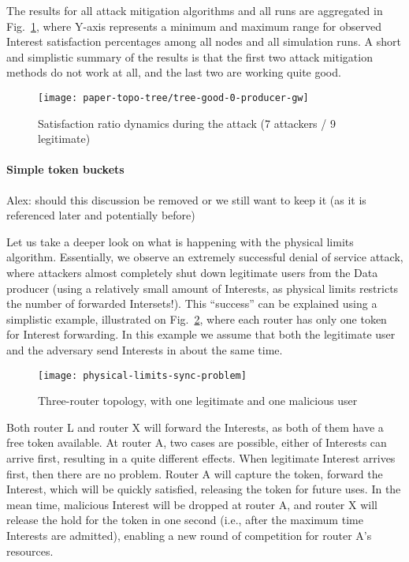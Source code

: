 The results for all attack mitigation algorithms and all runs are aggregated in Fig.~\ref{fig:small-scale attack progress}, where Y-axis represents a minimum and maximum range for observed Interest satisfaction percentages among all nodes and all simulation runs.
A short and simplistic summary of the results is that the first two attack mitigation methods do not work at all, and the last two are working quite good.

\begin{figure}[t]
  \centering
  \texttt{[image: paper-topo-tree/tree-good-0-producer-gw]}
  \caption{Satisfaction ratio dynamics during the attack (7 attackers / 9 legitimate)}
  \label{fig:small-scale attack progress}
\end{figure}

\paragraph{\textbf{Simple token buckets}}

{\color{red}Alex: should this discussion be removed or we still want to keep it (as it is referenced later and potentially before)}

Let us take a deeper look on what is happening with the physical limits algorithm.
Essentially, we observe an extremely successful denial of service attack, where attackers almost completely shut down legitimate users from the Data producer (using a relatively small amount of Interests, as physical limits restricts the number of forwarded Intersets!).
This ``success'' can be explained using a simplistic example, illustrated on Fig.~\ref{fig:three router example}, where each router has only one token for Interest forwarding.
In this example we assume that both the legitimate user and the adversary send Interests in about the same time.

\begin{figure}[t]
  \centering
  \texttt{[image: physical-limits-sync-problem]}
  \caption{Three-router topology, with one legitimate and one malicious user}
  \label{fig:three router example}
\end{figure}

Both router L and router X will forward the Interests, as both of them have a free token available.
At router A, two cases are possible, either of Interests can arrive first, resulting in a quite different effects.
When legitimate Interest arrives first, then there are no problem. 
Router A will capture the token, forward the Interest, which will be quickly satisfied, releasing the token for future uses.
In the mean time, malicious Interest will be dropped at router A, and router X will release the hold for the token in one second (i.e., after the maximum time Interests are admitted), enabling a new round of competition for router A's resources.

